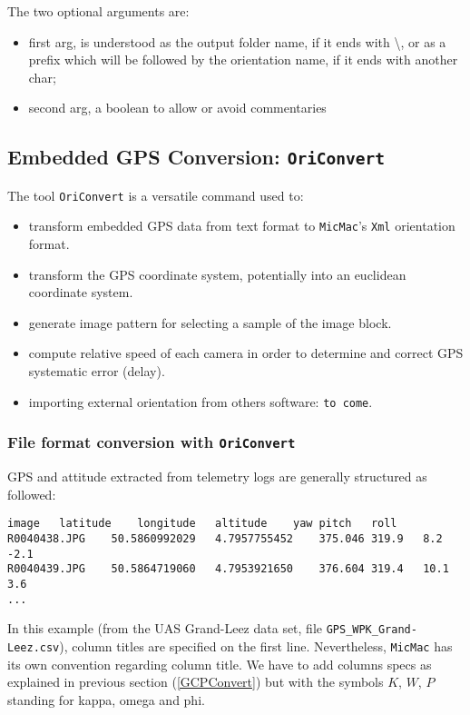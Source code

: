 \vspace{\baselineskip}
The two optional arguments are:
\begin{itemize}
    \item first arg, is understood as the output folder name, if it ends with \textbackslash, or as a prefix which will be followed by the orientation name, if it ends with another char;
    \item second arg, a boolean to allow or avoid commentaries
\end{itemize}

\subsection{Embedded GPS Conversion: {\tt OriConvert}}\label{OriConvert}

The tool {\tt OriConvert} is a versatile command used to:
\begin{itemize}
\item transform embedded GPS data from text format to {\tt MicMac}'s {\tt Xml} orientation format.
\item transform the GPS coordinate system, potentially into an euclidean coordinate system.
\item generate image pattern for selecting a sample of the image block.
\item compute relative speed of each camera in order to determine and correct GPS systematic error (delay).
\item importing external orientation from others software: {\tt to come}.
\end{itemize}

\subsubsection{File format conversion with {\tt OriConvert}}

GPS and attitude extracted from telemetry logs are generally structured as followed:

\begin{verbatim}
image	latitude	longitude	altitude	yaw	pitch	roll
R0040438.JPG	50.5860992029	4.7957755452	375.046	319.9	8.2	-2.1
R0040439.JPG	50.5864719060	4.7953921650	376.604	319.4	10.1	3.6
...
\end{verbatim}


In this example (from the UAS Grand-Leez data set, file {\tt GPS\_WPK\_Grand-Leez.csv}), column titles are specified on the first line. Nevertheless, {\tt MicMac} has its own convention regarding column title. We have to add columns specs as explained in previous section (\ref{GCPConvert}) but with the symbols $K$, $W$, $P$ standing for kappa, omega and phi.

